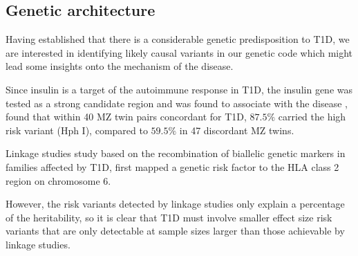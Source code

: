
\subsection{Genetic architecture}

Having established that there is a considerable genetic predisposition to T1D, we are interested in identifying likely causal variants in our genetic code which might lead
some insights onto the mechanism of the disease.

Since insulin is a target of the autoimmune response in T1D, the insulin gene  was tested as a strong candidate region and was found to associate with
the disease \citep{Metcalfe:2001}, 
\citet{Metcalfe:2001} found that within 40 \gls{MZ} twin pairs concordant for T1D, $87.5\%$ carried the high risk  variant (Hph I),
compared to $59.5\%$ in 47 discordant MZ twins.


Linkage studies study based on the recombination of biallelic genetic markers in families affected by T1D, first mapped a genetic risk factor to the HLA class 2 region on chromosome 6.





However, the risk variants detected by linkage studies only explain a percentage of the heritability,
so it is clear that T1D must involve smaller effect size risk variants that are only detectable at sample sizes larger than those achievable by linkage studies.


